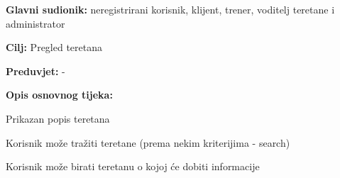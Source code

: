 					\noindent {}
					\begin{packed_item}
	
						\item \textbf{Glavni sudionik: }neregistrirani korisnik, klijent, trener, voditelj teretane i administrator
						\item  \textbf{Cilj:} Pregled teretana
						\item  \textbf{Preduvjet:} -
						\item  \textbf{Opis osnovnog tijeka:}
						
						\item[] \begin{packed_enum}
	
							\item Prikazan popis teretana
							\item Korisnik može tražiti teretane (prema nekim kriterijima - search)
							\item Korisnik može birati teretanu o kojoj će dobiti informacije
						\end{packed_enum}
						\end{packed_item}
						
